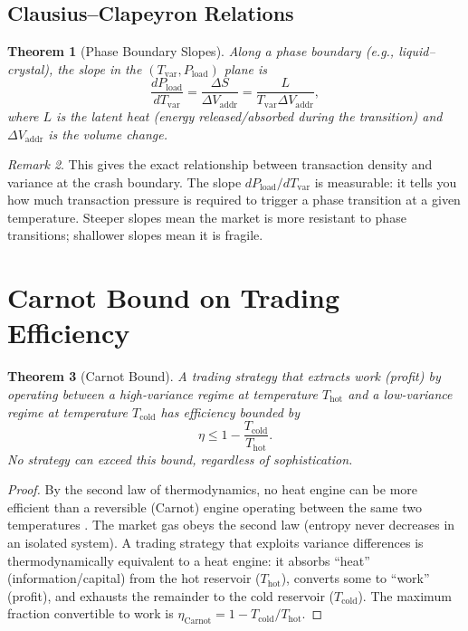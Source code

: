 \documentclass[twocolumn,10pt]{article}
\newtheorem{theorem}{Theorem}[section]
\theoremstyle{remark}
\newtheorem{remark}[theorem]{Remark}
\newcommand{\Tvar}{T_{\mathrm{var}}}
\newcommand{\Pload}{P_{\mathrm{load}}}
\newcommand{\Vaddr}{V_{\mathrm{addr}}}
\begin{document}
\subsection{Clausius--Clapeyron Relations}

\begin{theorem}[Phase Boundary Slopes]
\label{thm:clausius_clapeyron}
Along a phase boundary (e.g., liquid--crystal), the slope in the $(\Tvar, \Pload)$ plane is
\begin{equation}
    \frac{d\Pload}{d\Tvar} = \frac{\Delta S}{\Delta \Vaddr} = \frac{L}{\Tvar \Delta \Vaddr},
    \label{eq:clausius_clapeyron}
\end{equation}
where $L$ is the latent heat (energy released/absorbed during the transition) and $\Delta\Vaddr$ is the volume change.
\end{theorem}

\begin{remark}
This gives the exact relationship between transaction density and variance at the crash boundary.  The slope $d\Pload/d\Tvar$ is measurable: it tells you how much transaction pressure is required to trigger a phase transition at a given temperature.  Steeper slopes mean the market is more resistant to phase transitions; shallower slopes mean it is fragile.
\end{remark}


\section{Carnot Bound on Trading Efficiency}
\label{sec:carnot}

\begin{theorem}[Carnot Bound]
\label{thm:carnot}
A trading strategy that extracts work (profit) by operating between a high-variance regime at temperature $T_{\mathrm{hot}}$ and a low-variance regime at temperature $T_{\mathrm{cold}}$ has efficiency bounded by
\begin{equation}
    \boxed{\eta \leq 1 - \frac{T_{\mathrm{cold}}}{T_{\mathrm{hot}}}}.
    \label{eq:carnot}
\end{equation}
No strategy can exceed this bound, regardless of sophistication.
\end{theorem}

\begin{proof}
By the second law of thermodynamics, no heat engine can be more efficient than a reversible (Carnot) engine operating between the same two temperatures \cite{carnot1824,landau1980}.  The market gas obeys the second law (entropy never decreases in an isolated system).  A trading strategy that exploits variance differences is thermodynamically equivalent to a heat engine: it absorbs ``heat'' (information/capital) from the hot reservoir ($T_{\mathrm{hot}}$), converts some to ``work'' (profit), and exhausts the remainder to the cold reservoir ($T_{\mathrm{cold}}$).  The maximum fraction convertible to work is $\eta_{\mathrm{Carnot}} = 1 - T_{\mathrm{cold}}/T_{\mathrm{hot}}$.
\end{proof}
\end{document}

